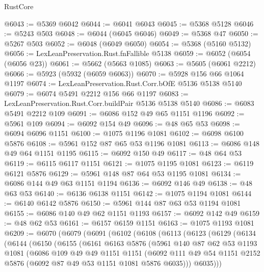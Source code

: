 \begin{lexlean}{RustCore}
\begin{coremodule}
@6043 := @5369 @6042
@6044 := @6041 @6043
@6045 := @5368 @5128
@6046 := @5243 @503
@6048 := @6044 (@6045 @6046)
@6049 := @5368 @47
@6050 := @5267 @503
@6052 := @6048 (@6049 @6050)
@6054 := @5368 (@5160 @5132)
@6056 := LexLeanPreservation.Rust.fnFallible @5138
@6059 := @6052 (@6054 (@6056 @23))
@6061 := @5662 (@5663 @1085)
@6063 := @5605 (@6061 @2212)
@6066 := @5923 (@5932 (@6059 @6063))
@6070 := @5928 @156 @66 @1064 @1197
@6074 := LexLeanPreservation.Rust.Corr.bOfE @5136 @5138 @5140
@6079 := @6074 @5491 @2212 @156 @66 @1197
@6083 := LexLeanPreservation.Rust.Corr.buildPair @5136 @5138 @5140
@6086 := @6083 @5491 @2212 @109
@6091 := @6086 @152 @49 @65 @1151 @1196
@6092 := @5961 @109
@6094 := @6092 @154 @49
@6096 := @48 @65 @53
@6098 := @6094 @6096 @1151
@6100 := @1075 @1196 @1081
@6102 := @6098 @6100 @5876
@6108 := @5961 @152 @87 @65 @53 @1196 @1081
@6113 := @6086 @148 @49 @64 @1151 @1195
@6115 := @6092 @150 @49
@6117 := @48 @64 @53
@6119 := @6115 @6117 @1151
@6121 := @1075 @1195 @1081
@6123 := @6119 @6121 @5876
@6129 := @5961 @148 @87 @64 @53 @1195 @1081
@6134 := @6086 @144 @49 @63 @1151 @1194
@6136 := @6092 @146 @49
@6138 := @48 @63 @53
@6140 := @6136 @6138 @1151
@6142 := @1075 @1194 @1081
@6144 := @6140 @6142 @5876
@6150 := @5961 @144 @87 @63 @53 @1194 @1081
@6155 := @6086 @140 @49 @62 @1151 @1193
@6157 := @6092 @142 @49
@6159 := @48 @62 @53
@6161 := @6157 @6159 @1151
@6163 := @1075 @1193 @1081
@6209 := @6070
    (@6079
      (@6091
        (@6102
          (@6108
            (@6113
              (@6123
                (@6129
                  (@6134
                    (@6144
                      (@6150
                        (@6155
                          (@6161
                            @6163
                            @5876
                            (@5961
                              @140
                              @87
                              @62
                              @53
                              @1193
                              @1081
                              (@6086
                                @109
                                @49
                                @49
                                @1151
                                @1151
                                (@6092
                                  @111
                                  @49
                                  @54
                                  @1151
                                  @2152
                                  @5876
                                  (@6092 @87 @49 @53 @1151 @1081 @5876 @6035)))
                              @6035)))

\end{coremodule}
\end{lexlean}
